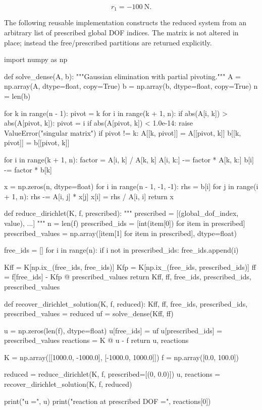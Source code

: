 \begin{equation}
    r_1=-100~\mathrm{N}.
\end{equation}

The following reusable implementation constructs the reduced system from an
arbitrary list of prescribed global DOF indices. The matrix is not altered in
place; instead the free/prescribed partitions are returned explicitly.

\begin{python}
import numpy as np


def solve_dense(A, b):
    """Gaussian elimination with partial pivoting."""
    A = np.array(A, dtype=float, copy=True)
    b = np.array(b, dtype=float, copy=True)
    n = len(b)

    for k in range(n - 1):
        pivot = k
        for i in range(k + 1, n):
            if abs(A[i, k]) > abs(A[pivot, k]):
                pivot = i
        if abs(A[pivot, k]) < 1.0e-14:
            raise ValueError("singular matrix")
        if pivot != k:
            A[[k, pivot]] = A[[pivot, k]]
            b[[k, pivot]] = b[[pivot, k]]

        for i in range(k + 1, n):
            factor = A[i, k] / A[k, k]
            A[i, k:] -= factor * A[k, k:]
            b[i] -= factor * b[k]

    x = np.zeros(n, dtype=float)
    for i in range(n - 1, -1, -1):
        rhs = b[i]
        for j in range(i + 1, n):
            rhs -= A[i, j] * x[j]
        x[i] = rhs / A[i, i]
    return x


def reduce_dirichlet(K, f, prescribed):
    """
    prescribed = [(global_dof_index, value), ...]
    """
    n = len(f)
    prescribed_ids = [int(item[0]) for item in prescribed]
    prescribed_values = np.array([item[1] for item in prescribed], dtype=float)

    free_ids = []
    for i in range(n):
        if i not in prescribed_ids:
            free_ids.append(i)

    Kff = K[np.ix_(free_ids, free_ids)]
    Kfp = K[np.ix_(free_ids, prescribed_ids)]
    ff = f[free_ids] - Kfp @ prescribed_values
    return Kff, ff, free_ids, prescribed_ids, prescribed_values


def recover_dirichlet_solution(K, f, reduced):
    Kff, ff, free_ids, prescribed_ids, prescribed_values = reduced
    uf = solve_dense(Kff, ff)

    u = np.zeros(len(f), dtype=float)
    u[free_ids] = uf
    u[prescribed_ids] = prescribed_values
    reactions = K @ u - f
    return u, reactions


K = np.array([[1000.0, -1000.0],
              [-1000.0, 1000.0]])
f = np.array([0.0, 100.0])

reduced = reduce_dirichlet(K, f, prescribed=[(0, 0.0)])
u, reactions = recover_dirichlet_solution(K, f, reduced)

print("u =", u)
print("reaction at prescribed DOF =", reactions[0])
\end{python}

